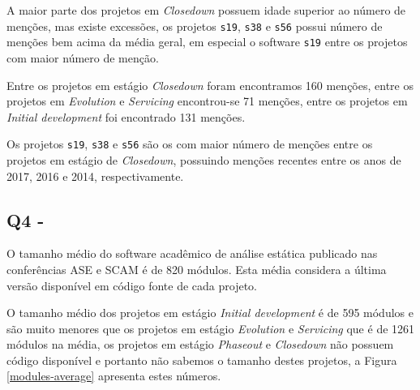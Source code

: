 A maior parte dos projetos em {\it Closedown} possuem idade superior ao número
de menções, mas existe excessões, os projetos \texttt{s19}, \texttt{s38} e
\texttt{s56} possui número de menções bem acima da média geral, em especial o
software \texttt{s19} entre os projetos com maior número de menção.

Entre os projetos em estágio {\it Closedown} foram encontramos 160 menções,
entre os projetos em {\it Evolution} e {\it Servicing} encontrou-se 71 menções,
entre os projetos em {\it Initial development} foi encontrado 131 menções.

Os projetos \texttt{s19}, \texttt{s38} e \texttt{s56} são os com maior número de
menções entre os projetos em estágio de {\it Closedown}, possuindo menções
recentes entre os anos de 2017, 2016 e 2014, respectivamente.

\subsection{Q4 - \QuestaoQuatro} %

O tamanho médio do software acadêmico de análise estática publicado nas
conferências ASE e SCAM é de 820 módulos. Esta média considera a última versão
disponível em código fonte de cada projeto.


O tamanho médio dos projetos em estágio {\it Initial development} é de 595
módulos e são muito menores que os projetos em estágio {\it Evolution} e {\it
Servicing} que é de 1261 módulos na média, os projetos em estágio {\it
Phaseout} e {\it Closedown} não possuem código disponível e portanto não
sabemos o tamanho destes projetos, a Figura \ref{modules-average} apresenta
estes números.

